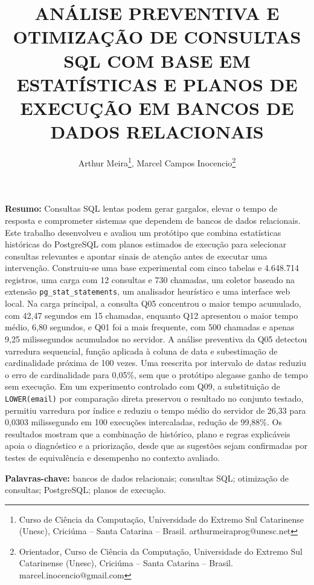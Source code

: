 \documentclass{UNESC}
\title{ANÁLISE PREVENTIVA E OTIMIZAÇÃO DE CONSULTAS SQL COM BASE EM ESTATÍSTICAS E PLANOS DE EXECUÇÃO EM BANCOS DE DADOS RELACIONAIS}
\author{Arthur Meira\footnote{Curso de Ciência da Computação, Universidade do Extremo Sul Catarinense (Unesc), Criciúma -- Santa Catarina -- Brasil. arthurmeiraprog@unesc.net},
Marcel Campos Inocencio\footnote{Orientador, Curso de Ciência da Computação, Universidade do Extremo Sul Catarinense (Unesc), Criciúma -- Santa Catarina -- Brasil. marcel.inocencio@gmail.com}}
\newcommand{\codigo}[1]{\texttt{#1}}
\newcommand{\perc}{\%}
\begin{document}
\onehalfspacing
\maketitle

\noindent\textbf{Resumo:} Consultas SQL lentas podem gerar gargalos, elevar o tempo de resposta e comprometer sistemas que dependem de bancos de dados relacionais. Este trabalho desenvolveu e avaliou um protótipo que combina estatísticas históricas do PostgreSQL com planos estimados de execução para selecionar consultas relevantes e apontar sinais de atenção antes de executar uma intervenção. Construiu-se uma base experimental com cinco tabelas e 4.648.714 registros, uma carga com 12 consultas e 730 chamadas, um coletor baseado na extensão \codigo{pg\_stat\_statements}, um analisador heurístico e uma interface web local. Na carga principal, a consulta Q05 concentrou o maior tempo acumulado, com 42,47 segundos em 15 chamadas, enquanto Q12 apresentou o maior tempo médio, 6,80 segundos, e Q01 foi a mais frequente, com 500 chamadas e apenas 9,25 milissegundos acumulados no servidor. A análise preventiva da Q05 detectou varredura sequencial, função aplicada à coluna de data e subestimação de cardinalidade próxima de 100 vezes. Uma reescrita por intervalo de datas reduziu o erro de cardinalidade para 0,05\perc, sem que o protótipo alegasse ganho de tempo sem execução. Em um experimento controlado com Q09, a substituição de \codigo{LOWER(email)} por comparação direta preservou o resultado no conjunto testado, permitiu varredura por índice e reduziu o tempo médio do servidor de 26,33 para 0,0303 milissegundo em 100 execuções intercaladas, redução de 99,88\perc. Os resultados mostram que a combinação de histórico, plano e regras explicáveis apoia o diagnóstico e a priorização, desde que as sugestões sejam confirmadas por testes de equivalência e desempenho no contexto avaliado.

\vspace{0.5em}
\noindent\textbf{Palavras-chave:} bancos de dados relacionais; consultas SQL; otimização de consultas; PostgreSQL; planos de execução.
\end{document}
